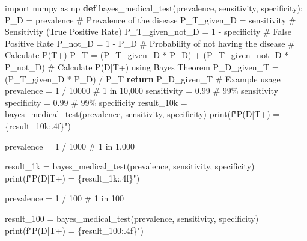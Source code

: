 \documentclass[
  letterpaper,
  DIV=11,
  numbers=noendperiod]{scrreport}
\newenvironment{Shaded}{\begin{snugshade}}{\end{snugshade}}
\newcommand{\BuiltInTok}[1]{\textcolor[rgb]{0.00,0.23,0.31}{#1}}
\newcommand{\CommentTok}[1]{\textcolor[rgb]{0.37,0.37,0.37}{#1}}
\newcommand{\ControlFlowTok}[1]{\textcolor[rgb]{0.00,0.23,0.31}{\textbf{#1}}}
\newcommand{\DecValTok}[1]{\textcolor[rgb]{0.68,0.00,0.00}{#1}}
\newcommand{\FloatTok}[1]{\textcolor[rgb]{0.68,0.00,0.00}{#1}}
\newcommand{\ImportTok}[1]{\textcolor[rgb]{0.00,0.46,0.62}{#1}}
\newcommand{\KeywordTok}[1]{\textcolor[rgb]{0.00,0.23,0.31}{\textbf{#1}}}
\newcommand{\NormalTok}[1]{\textcolor[rgb]{0.00,0.23,0.31}{#1}}
\newcommand{\OperatorTok}[1]{\textcolor[rgb]{0.37,0.37,0.37}{#1}}
\newcommand{\SpecialCharTok}[1]{\textcolor[rgb]{0.37,0.37,0.37}{#1}}
\newcommand{\SpecialStringTok}[1]{\textcolor[rgb]{0.13,0.47,0.30}{#1}}
\theoremstyle{definition}
\theoremstyle{plain}
\theoremstyle{definition}
\theoremstyle{plain}
\theoremstyle{remark}
\begin{document}
\begin{Shaded}
\begin{Highlighting}[numbers=left,,]
\ImportTok{import}\NormalTok{ numpy }\ImportTok{as}\NormalTok{ np}
\KeywordTok{def}\NormalTok{ bayes\_medical\_test(prevalence, sensitivity, specificity):}
\NormalTok{    P\_D }\OperatorTok{=}\NormalTok{ prevalence  }\CommentTok{\# Prevalence of the disease}
\NormalTok{    P\_T\_given\_D }\OperatorTok{=}\NormalTok{ sensitivity  }\CommentTok{\# Sensitivity (True Positive Rate)}
\NormalTok{    P\_T\_given\_not\_D }\OperatorTok{=} \DecValTok{1} \OperatorTok{{-}}\NormalTok{ specificity  }\CommentTok{\# False Positive Rate}
\NormalTok{    P\_not\_D }\OperatorTok{=} \DecValTok{1} \OperatorTok{{-}}\NormalTok{ P\_D  }\CommentTok{\# Probability of not having the disease}
    \CommentTok{\# Calculate P(T+)}
\NormalTok{    P\_T }\OperatorTok{=}\NormalTok{ (P\_T\_given\_D }\OperatorTok{*}\NormalTok{ P\_D) }\OperatorTok{+}\NormalTok{ (P\_T\_given\_not\_D }\OperatorTok{*}\NormalTok{ P\_not\_D)}
    \CommentTok{\# Calculate P(D|T+) using Bayes\textquotesingle{} Theorem}
\NormalTok{    P\_D\_given\_T }\OperatorTok{=}\NormalTok{ (P\_T\_given\_D }\OperatorTok{*}\NormalTok{ P\_D) }\OperatorTok{/}\NormalTok{ P\_T}
    \ControlFlowTok{return}\NormalTok{ P\_D\_given\_T}
\CommentTok{\# Example usage}
\NormalTok{prevalence }\OperatorTok{=} \DecValTok{1} \OperatorTok{/} \DecValTok{10000}  \CommentTok{\# 1 in 10,000}
\NormalTok{sensitivity }\OperatorTok{=} \FloatTok{0.99}  \CommentTok{\# 99\% sensitivity}
\NormalTok{specificity }\OperatorTok{=} \FloatTok{0.99}  \CommentTok{\# 99\% specificity}
\NormalTok{result\_10k }\OperatorTok{=}\NormalTok{ bayes\_medical\_test(prevalence, sensitivity, specificity)}
\BuiltInTok{print}\NormalTok{(}\SpecialStringTok{f"P(D|T+) = }\SpecialCharTok{\{}\NormalTok{result\_10k}\SpecialCharTok{:.4f\}}\SpecialStringTok{"}\NormalTok{)}

\NormalTok{prevalence }\OperatorTok{=} \DecValTok{1} \OperatorTok{/} \DecValTok{1000}  \CommentTok{\# 1 in 1,000}

\NormalTok{result\_1k }\OperatorTok{=}\NormalTok{ bayes\_medical\_test(prevalence, sensitivity, specificity)}
\BuiltInTok{print}\NormalTok{(}\SpecialStringTok{f"P(D|T+) = }\SpecialCharTok{\{}\NormalTok{result\_1k}\SpecialCharTok{:.4f\}}\SpecialStringTok{"}\NormalTok{)}

\NormalTok{prevalence }\OperatorTok{=} \DecValTok{1} \OperatorTok{/} \DecValTok{100}  \CommentTok{\# 1 in 100}

\NormalTok{result\_100 }\OperatorTok{=}\NormalTok{ bayes\_medical\_test(prevalence, sensitivity, specificity)}
\BuiltInTok{print}\NormalTok{(}\SpecialStringTok{f"P(D|T+) = }\SpecialCharTok{\{}\NormalTok{result\_100}\SpecialCharTok{:.4f\}}\SpecialStringTok{"}\NormalTok{)}
\end{Highlighting}
\end{Shaded}
\end{document}
